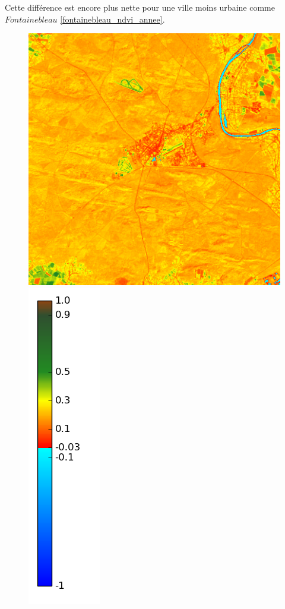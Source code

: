 \documentclass{book}
\begin{document}
\clearpage

Cette différence est encore plus nette pour une ville moins urbaine comme $Fontainebleau$ \ref{fontainebleau_ndvi_annee}.
 
\begin{figure}[H]
\centerline{
\includegraphics[scale=0.25]{images/Fontainebleau/03_ndvi.png}
\includegraphics[scale=0.2]{images/colormap.png}
}
\end{figure}
\end{document}
